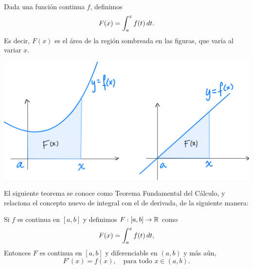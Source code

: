 \noindent
\begin{minipage}{.4\textwidth}  Dada una función continua $f$, definimos 
  \[
  F(x)=\int_a^x f(t)\,dt.
  \]
  Es decir, $F(x)$ es el área de la región sombreada en las figuras, que varía al variar $x$.
\end{minipage}
\begin{minipage}{.6\textwidth}
  \begin{center}
    \includegraphics[width=.95\textwidth]{pics/integral-hasta-x.png}
  \end{center}
\end{minipage}

El siguiente teorema se conoce como Teorema Fundamental del Cálculo, y relaciona el concepto nuevo de integral con el de derivada, de la siguiente manera:

\begin{theorem}\label{T:TFC}
  Si $f$ es continua en $[a,b]$ y definimos $F:[a,b]\to\mathbb{R}$ como 
  \[
  F(x)=\int_a^x f(t)\,dt,
  \]
  Entonces $F$ es continua en $[a,b]$ y diferenciable en $(a,b)$ y más aún, 
  \[
  F'(x)=f(x),\quad\text{para todo $x\in(a,b)$.}
  \]
\end{theorem}


